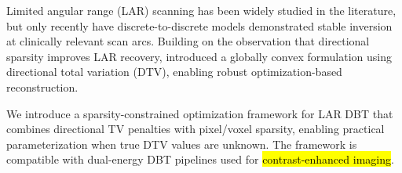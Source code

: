 \documentclass[journal, a4paper]{IEEEtran}
\begin{document}



Limited angular range (LAR) scanning has been widely studied in the literature, but only recently have discrete-to-discrete models demonstrated stable inversion at clinically relevant scan arcs. Building on the observation that directional sparsity improves LAR recovery, \cite{zhang2021directional} introduced a globally convex formulation using directional total variation (DTV), enabling robust optimization-based reconstruction.

We introduce a sparsity-constrained optimization framework for LAR DBT that combines directional TV penalties with pixel/voxel sparsity, enabling practical parameterization when true DTV values are unknown. The framework is compatible with dual-energy DBT pipelines used for \hl{contrast-enhanced imaging}.

\end{document}
